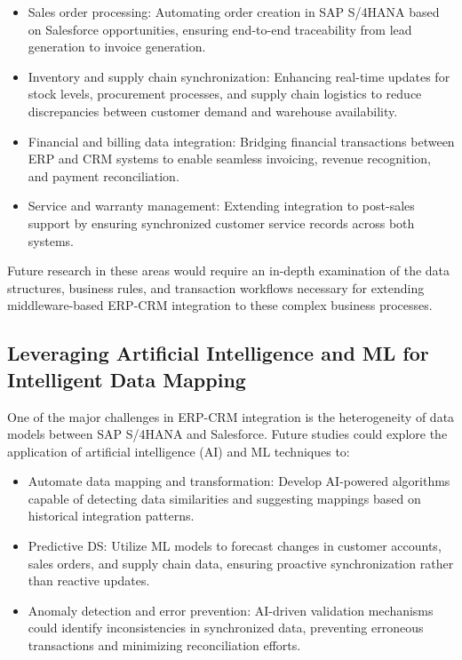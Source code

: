 \begin{itemize}
    \item Sales order processing: Automating order creation in SAP S/4HANA based on Salesforce opportunities, ensuring end-to-end traceability from lead generation to invoice generation.
    \item Inventory and supply chain synchronization: Enhancing real-time updates for stock levels, procurement processes, and supply chain logistics to reduce discrepancies between customer demand and warehouse availability.
    \item Financial and billing data integration: Bridging financial transactions between ERP and CRM systems to enable seamless invoicing, revenue recognition, and payment reconciliation.
    \item Service and warranty management: Extending integration to post-sales support by ensuring synchronized customer service records across both systems.
\end{itemize}

Future research in these areas would require an in-depth examination of the data structures, business rules, and transaction workflows necessary for extending middleware-based ERP-CRM integration to these complex business processes.

\subsection{Leveraging Artificial Intelligence and ML for Intelligent Data Mapping}
One of the major challenges in ERP-CRM integration is the heterogeneity of data models between SAP S/4HANA and Salesforce. Future studies could explore the application of artificial intelligence (AI) and ML techniques to:

\begin{itemize}
    \item Automate data mapping and transformation: Develop AI-powered algorithms capable of detecting data similarities and suggesting mappings based on historical integration patterns.
    \item Predictive DS: Utilize ML models to forecast changes in customer accounts, sales orders, and supply chain data, ensuring proactive synchronization rather than reactive updates.
    \item Anomaly detection and error prevention: AI-driven validation mechanisms could identify inconsistencies in synchronized data, preventing erroneous transactions and minimizing reconciliation efforts.
\end{itemize}

